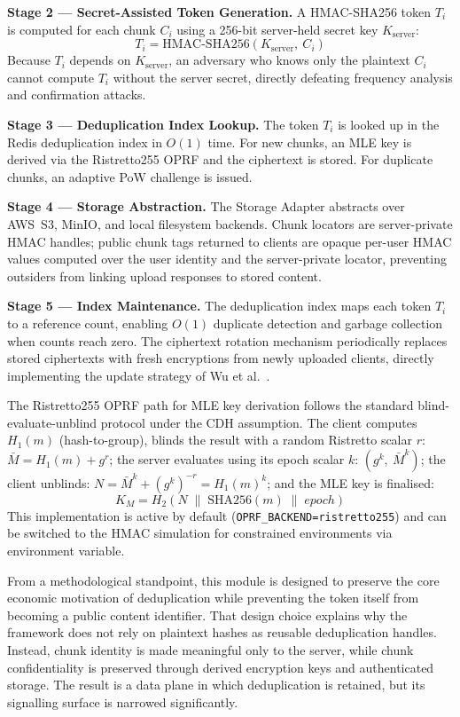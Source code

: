 \documentclass[12pt,a4paper,oneside]{report}
\newcommand{\KS}{K_{\mathrm{server}}}
\newcommand{\HMAC}{\mathrm{HMAC\text{-}SHA256}}
\begin{document}
\textbf{Stage 2 — Secret-Assisted Token Generation.}
A HMAC-SHA256 token $T_i$ is computed for each chunk $C_i$ using a 256-bit server-held secret key $\KS$:
\begin{equation}
  T_i = \HMAC(\KS,\ C_i)
  \label{eq:token}
\end{equation}
Because $T_i$ depends on $\KS$, an adversary who knows only the plaintext $C_i$ cannot compute $T_i$ without the server secret, directly defeating frequency analysis and confirmation attacks.

\textbf{Stage 3 — Deduplication Index Lookup.}
The token $T_i$ is looked up in the Redis deduplication index in $O(1)$ time.
For new chunks, an MLE key is derived via the Ristretto255 OPRF and the ciphertext is stored.
For duplicate chunks, an adaptive PoW challenge is issued.

\textbf{Stage 4 — Storage Abstraction.}
The Storage Adapter abstracts over AWS~S3, MinIO, and local filesystem backends.
Chunk locators are server-private HMAC handles; public chunk tags returned to clients are opaque per-user HMAC values computed over the user identity and the server-private locator, preventing outsiders from linking upload responses to stored content.

\textbf{Stage 5 — Index Maintenance.}
The deduplication index maps each token $T_i$ to a reference count, enabling $O(1)$ duplicate detection and garbage collection when counts reach zero.
The ciphertext rotation mechanism periodically replaces stored ciphertexts with fresh encryptions from newly uploaded clients, directly implementing the update strategy of Wu et al.~\cite{wu2024refa}.

The Ristretto255 OPRF path for MLE key derivation follows the standard blind-evaluate-unblind protocol under the CDH assumption.
The client computes $H_1(m)$ (hash-to-group), blinds the result with a random Ristretto scalar $r$: $\bar{M} = H_1(m) + g^r$; the server evaluates using its epoch scalar $k$: $(g^k,\ \bar{M}^k)$; the client unblinds: $N = \bar{M}^k + (g^k)^{-r} = H_1(m)^k$; and the MLE key is finalised:
\begin{equation}
  K_M = H_2\!\left(N \;\|\; \mathrm{SHA256}(m) \;\|\; \mathit{epoch}\right)
  \label{eq:km}
\end{equation}
This implementation is active by default (\texttt{OPRF\_BACKEND=ristretto255}) and can be switched to the HMAC simulation for constrained environments via environment variable.

From a methodological standpoint, this module is designed to preserve the core economic motivation of deduplication while preventing the token itself from becoming a public content identifier.
That design choice explains why the framework does not rely on plaintext hashes as reusable deduplication handles.
Instead, chunk identity is made meaningful only to the server, while chunk confidentiality is preserved through derived encryption keys and authenticated storage.
The result is a data plane in which deduplication is retained, but its signalling surface is narrowed significantly.
\end{document}
